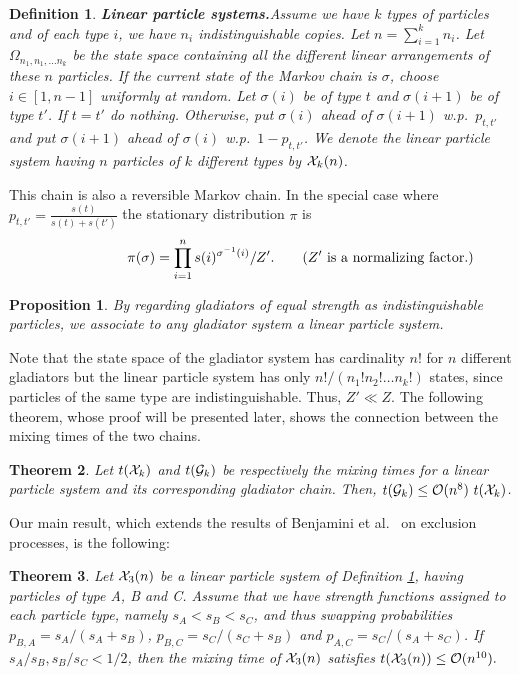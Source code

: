 \documentclass[10 pt]{article}
\newcommand{\G}{{\cal G}}
\newcommand{\EX}{{\cal X}}
\newtheorem{defin}{Definition}[section]
\newtheorem{thm}{Theorem}[section]
\newtheorem{prop}[thm]{Proposition}
\begin{document}
\begin{defin}\textbf{Linear particle systems.}\label{defparts}
Assume we have $k$ types of particles and of each type $i$, we have $n_i$ indistinguishable copies. Let $n=\sum_{i=1}^{k}n_i$. 
Let $\Omega_{n_1,n_1,\dots n_k}$ be the state space containing all the different linear arrangements of these $n$ particles. 
If the current state of the Markov chain is $\sigma$, choose $i\in [1,n-1]$ uniformly at random.  Let $\sigma(i)$ be of type $t$
and $\sigma(i+1)$ be of type $t'$. If $t=t'$ do nothing. Otherwise, put $\sigma(i)$ ahead of $\sigma(i+1)$ w.p.\ $p_{t,t'}$ and
put $\sigma(i+1)$ ahead of $\sigma(i)$ w.p.\ $1-p_{t,t'}$.  We denote the linear particle system having $n$ particles of
$k$ different types by ${\EX}_k(n)$.
\end{defin}
This chain  is also a reversible Markov chain. In the special case where $p_{t,t'}=\frac{s(t)}{s(t)+s(t')}$  the stationary distribution $\pi$ is
\begin{equation}
\hspace{2 cm}\pi(\sigma)=\prod_{\substack{i=1}}^{n} s(i)^{\sigma^{-1}(i)}/Z'.
\quad \quad(Z' \text{ is a normalizing factor.})
\end{equation}\label{eq2}

\begin{prop}
By regarding gladiators of equal strength as indistinguishable particles, we associate to any gladiator system a linear particle system.
\end{prop}

Note that the state space of the gladiator system has cardinality $n!$ for $n$ different gladiators but the linear particle system has only
$n!/(n_1!n_2!\dots n_k!)$ states, since particles of the same type are indistinguishable. Thus, $Z'\ll Z$. The following theorem,
whose proof will be presented later, shows the connection between the mixing times of the two chains.
\begin{thm}\label{reduction}
Let $t({\EX_k})$ and $t({\G}_k)$ be respectively the mixing times for a linear particle system and its corresponding gladiator chain.
Then, $t(\G_k) \leq \mathcal{O} (n^8)~ t(\EX_k)$.
\end{thm}


Our main result, which extends the results of Benjamini et al.\ \cite{Benjamini} on exclusion processes, is the following:

\begin{thm}\label{mainthm}
Let $\EX_{3}(n)$ be a linear particle system of Definition \ref{defparts}, having particles of type A, B and C.
Assume that we have strength functions assigned to each particle type, namely $s_A< s_B<s_C$, and thus swapping probabilities
$p_{B,A}=s_A/(s_A+s_B)$, $p_{B,C}=s_C/(s_C+s_B)$ and $p_{A,C}=s_C/(s_A+s_C)$.
If $s_A/s_B,s_B/s_C<1/2$, then the mixing time of $\EX_{3}(n)$ satisfies $t({\EX}_{3}(n))\leq {\cal O}(n^{10}).$

\end{thm}
\end{document}
